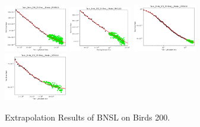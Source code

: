 \documentclass{article} %
\begin{document}
\begin{figure}[!htb]
\includegraphics[width=0.245\textwidth]{figures/scaling_laws_benchmark_dataset_plots/birds_25___MiX_B_16.png}
\includegraphics[width=0.245\textwidth]{figures/scaling_laws_benchmark_dataset_plots/birds_25___MiX_L_16.png}
\includegraphics[width=0.245\textwidth]{figures/scaling_laws_benchmark_dataset_plots/birds_25___ViT_B_16.png}
\includegraphics[width=0.245\textwidth]{figures/scaling_laws_benchmark_dataset_plots/birds_25___ViT_S_16.png}
\caption{
    Extrapolation Results of BNSL on Birds 200.
    }
    \label{fig:scaling_laws_benchmark_dataset__birds}
\end{figure}
\end{document}
